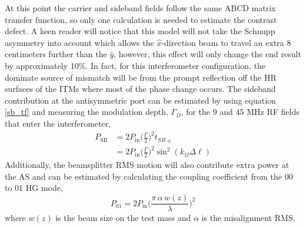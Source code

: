 	At this point the carrier and sideband fields follow the same ABCD matrix transfer function, so only one calculation is needed to estimate the contrast defect.  A keen reader will notice that this model will not take the Schnupp asymmetry into account which allows the $\hat{x}$-direction beam to travel an extra 8 centimeters further than the $\hat{y}$, however, this effect will only change the end result by approximately 10$\%$.  In fact, for this interferometer configuration, the dominate source of mismatch will be from the prompt reflection off the HR surfaces of the ITMs where most of the phase change occurs.  The sideband contribution at the antisymmetric port can be estimated by using equation \ref{sb_tf} and measuring the modulation depth, $\Gamma_{\Omega}$, for the 9 and 45 MHz RF fields that enter the interferometer,
	\begin{equation}
	\begin{aligned}
	P_{\text{SB}}	&= 2 P_{\text{in}} \bigg( \frac{\Gamma}{2} \bigg)^2 t_{SB\pm} \\
	&= 2 P_{\text{in}} \bigg( \frac{\Gamma}{2} \bigg)^2 \sin^2(k_{\Omega} \Delta \ell)
	\end{aligned}
	\end{equation}
	Additionally, the beamsplitter RMS motion will also contribute extra power at the AS and can be estimated by calculating the coupling coefficient from the 00 to 01 HG mode,
	\begin{equation}
	P_{01} = 2 P_{\text{in}} \bigg( \frac{\pi \, \alpha \, w(z)}{\lambda}\bigg)^2
	\end{equation}
	where $w(z)$ is the beam size on the test mass and $\alpha$ is the misalignment RMS.
	
